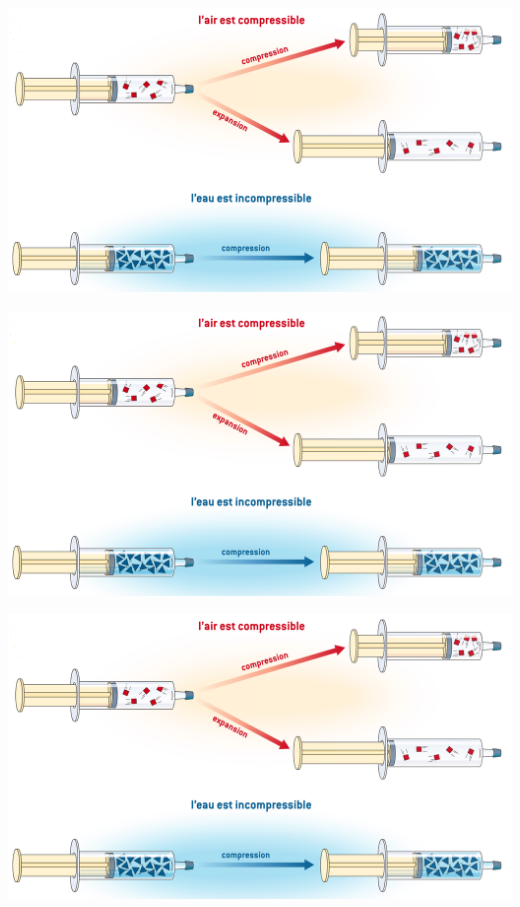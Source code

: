 \documentclass[12pt,a4paper]{article}
\date{}
\title{}
\begin{document}



\includegraphics[scale=0.35]{img/compression}

 \vspace*{0.5cm}
 
\includegraphics[scale=0.35]{img/compression}

\vspace*{0.5cm}

\includegraphics[scale=0.35]{img/compression}
%
%
%
%
%




	
\end{document}
